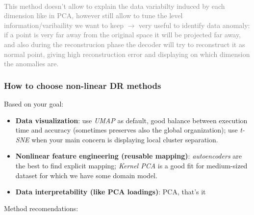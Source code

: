 \hfill\\
\textcolor{gray}{
This method doesn't allow to explain the data variabilty induced by each dimension like in 
PCA, however still allow to tune the level information/varibaility we want to keep
$\rightarrow$ very useful to identify data anomaly: if a point is very far away from the original
space it will be projected far away, and also during the reconstrucion phase the decoder will try
to reconstruct it as normal point, giving high reconstruction error and displaying on which 
dimension the anomalies are. 
}

\subsubsection{How to choose non-linear DR methods}
Based on your goal:
\begin{itemize}
    \item \textbf{Data visualization}: use \textit{UMAP} as default, good balance between 
    execution time and accuracy (sometimes preserves also the global organization); use 
    \textit{t-SNE} when your main concern is displaying local cluster separation.
    \item \textbf{Nonlinear feature engineering (reusable mapping)}: \textit{autoencoders}
    are the best to find explicit mapping; \textit{Kernel PCA} is a good fit for medium-sized
    dataset for which we have some domain model.
    \item \textbf{Data interpretability (like PCA loadings)}: PCA, that's it    
\end{itemize} 
\vspace{0.3cm}
Method recomendations:
